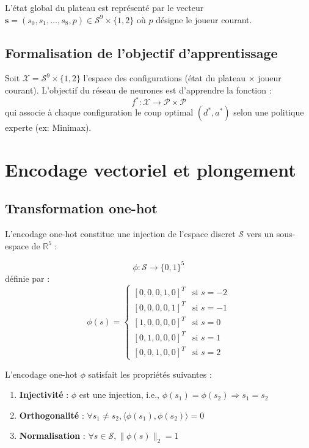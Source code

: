 \documentclass[12pt,a4paper]{report}
\numberwithin{equation}{section}
\begin{document}
L'état global du plateau est représenté par le vecteur $\mathbf{s} = (s_0, s_1, \ldots, s_8, p) \in \mathcal{S}^9 \times \{1, 2\}$ où $p$ désigne le joueur courant.

\subsection{Formalisation de l'objectif d'apprentissage}
\begin{theorem}
Soit $\mathcal{X} = \mathcal{S}^9 \times \{1, 2\}$ l'espace des configurations (état du plateau × joueur courant).
L'objectif du réseau de neurones est d'apprendre la fonction :
$$f^* : \mathcal{X} \rightarrow \mathcal{P} \times \mathcal{P}$$
qui associe à chaque configuration le coup optimal $(d^*, a^*)$ selon une politique experte (ex: Minimax).
\end{theorem}

\section{Encodage vectoriel et plongement}

\subsection{Transformation one-hot}
L'encodage one-hot constitue une injection de l'espace discret $\mathcal{S}$ vers un sous-espace de $\mathbb{R}^5$ :

\begin{definition}
$$\phi : \mathcal{S} \rightarrow \{0,1\}^5$$
définie par :
$$\phi(s) = \begin{cases}
[0,0,0,1,0]^T & \text{si } s = -2\\
[0,0,0,0,1]^T & \text{si } s = -1\\
[1,0,0,0,0]^T & \text{si } s = 0\\
[0,1,0,0,0]^T & \text{si } s = 1\\
[0,0,1,0,0]^T & \text{si } s = 2
\end{cases}$$
\end{definition}

\begin{theorem}
L'encodage one-hot $\phi$ satisfait les propriétés suivantes :
\begin{enumerate}
  \item \textbf{Injectivité} : $\phi$ est une injection, i.e., $\phi(s_1) = \phi(s_2) \Rightarrow s_1 = s_2$
  \item \textbf{Orthogonalité} : $\forall s_1 \neq s_2, \langle \phi(s_1), \phi(s_2) \rangle = 0$
  \item \textbf{Normalisation} : $\forall s \in \mathcal{S}, \|\phi(s)\|_2 = 1$
\end{enumerate}
\end{theorem}
\end{document}
